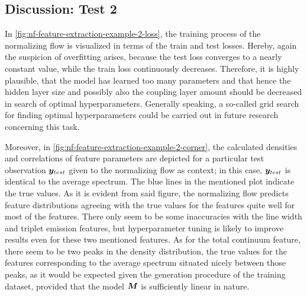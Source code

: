 \documentclass[a4paper,12pt]{report}
\begin{document}
\subsection{Discussion: Test 2}
In \cref{fig:nf-feature-extraction-example-2-loss}, the training process of the normalizing flow is visualized in terms of the train and test losses. Hereby, again the suspicion of overfitting arises, because the test loss converges to a nearly constant value, while the train loss continuously decreases. Therefore, it is highly plausible, that the model has learned too many parameters and that hence the hidden layer size and possibly also the coupling layer amount should be decreased in search of optimal hyperparameters. Generally speaking, a so-called grid search for finding optimal hyperparameters could be carried out in future research concerning this task.

Moreover, in \cref{fig:nf-feature-extraction-example-2-corner}, the calculated densities and correlations of feature parameters are depicted for a particular test observation $\bm{y}_{test}$ given to the normalizing flow as context; in this case, $\bm{y}_{test}$ is identical to the average spectrum. The blue lines in the mentioned plot indicate the true values. As it is evident from said figure, the normalizing flow predicts feature distributions agreeing with the true values for the features quite well for most of the features. There only seem to be some inaccuracies with the line width and triplet emission features, but hyperparameter tuning is likely to improve results even for these two mentioned features. As for the total continuum feature, there seem to be two peaks in the density distribution, the true values for the features corresponding to the average spectrum situated nicely between those peaks, as it would be expected given the generation procedure of the training dataset, provided that the model $\bm{M}$ is sufficiently linear in nature.
\end{document}
